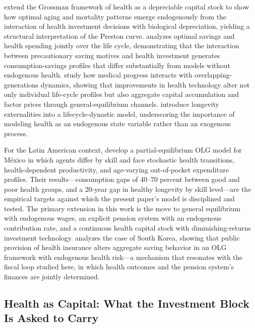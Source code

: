 \documentclass[12pt,a4paper]{article}
\begin{document}
\citet{DalgaardStrulik2014} extend the Grossman framework of health as a depreciable capital stock to show how optimal aging and mortality patterns emerge endogenously from the interaction of health investment decisions with biological depreciation, yielding a structural interpretation of the Preston curve. \citet{Fioroni2010} analyzes optimal savings and health spending jointly over the life cycle, demonstrating that the interaction between precautionary saving motives and health investment generates consumption-savings profiles that differ substantially from models without endogenous health. \citet{FrankovicWrzaczek2020} study how medical progress interacts with overlapping-generations dynamics, showing that improvements in health technology alter not only individual life-cycle profiles but also aggregate capital accumulation and factor prices through general-equilibrium channels. \citet{YewZhang2018} introduce longevity externalities into a lifecycle-dynastic model, underscoring the importance of modeling health as an endogenous state variable rather than an exogenous process.

For the Latin American context, \citet{CortesEtAl2024} develop a partial-equilibrium OLG model for M\'exico in which agents differ by skill and face stochastic health transitions, health-dependent productivity, and age-varying out-of-pocket expenditure profiles. Their results---consumption gaps of 40--70 percent between good and poor health groups, and a 20-year gap in healthy longevity by skill level---are the empirical targets against which the present paper's model is disciplined and tested. The primary extension in this work is the move to general equilibrium with endogenous wages, an explicit pension system with an endogenous contribution rate, and a continuous health capital stock with diminishing-returns investment technology. \citet{Lim2020} analyzes the case of South Korea, showing that public provision of health insurance alters aggregate saving behavior in an OLG framework with endogenous health risk---a mechanism that resonates with the fiscal loop studied here, in which health outcomes and the pension system's finances are jointly determined.

\subsection{Health as Capital: What the Investment Block Is Asked to Carry}
\label{subsec:lit_longevity}
\end{document}
